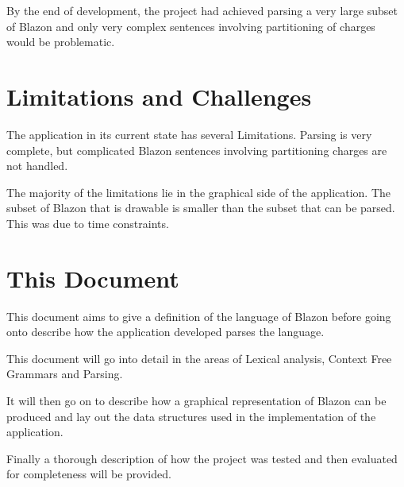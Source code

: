 By the end of development, the project had achieved parsing a very large subset of Blazon and only very complex sentences involving partitioning of charges would be problematic.  

\section{Limitations and Challenges}
The application in its current state has several Limitations. Parsing is very complete, but complicated Blazon sentences involving partitioning charges are not handled.  

The majority of the limitations lie in the graphical side of the application.  The subset of Blazon that is drawable is smaller than the subset that can be parsed.  This was due to time constraints.

\section{This Document}
This document aims to give a definition of the language of Blazon before going onto describe how the application developed parses the language.  

This document will go into detail in the areas of Lexical analysis, Context Free Grammars and Parsing.  

It will then go on to describe how a graphical representation of Blazon can be produced and lay out the data structures used in the implementation of the application. 

Finally a thorough description of how the project was tested and then evaluated for completeness will be provided. 





